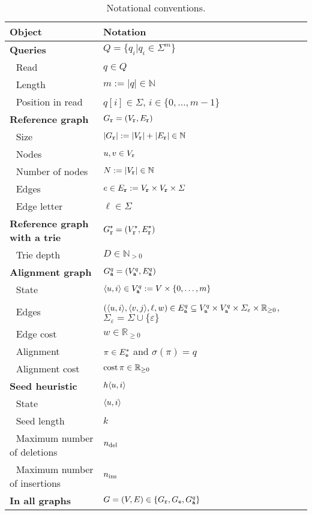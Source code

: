 \begin{table}[!h]
	\centering
	\caption{Notational conventions.}
	\begin{tabular}{ll}
	\hline
	\textbf{Object}	         & \textbf{Notation}\\
	\hline
	\textbf{Queries}  & $Q = \{ q_i \vert q_i \in \Sigma^m \}$ \\
	\,\, Read            & $q \in Q$ \\
	\,\, Length     & $m := \lvert q \rvert\in \mathbb{N}$\\
	\,\, Position in read & $q[i] \in \Sigma$, $i \in \{0,\dots,m-1\}$\\	
	\hline
	\textbf{Reference graph}& $G_\texttt{r}=(V_\texttt{r},E_\texttt{r})$\\
	\,\, Size& $\lvert G_\texttt{r} \rvert := \lvert V_\texttt{r} \rvert + \lvert E_\texttt{r} \rvert \in \mathbb{N}$\\
	\,\, Nodes& $u, v \in V_\texttt{r}$\\
	\,\, Number of nodes& $N := \lvert V_\texttt{r} \rvert \in \mathbb{N}$\\
	\,\, Edges& $e \in E_\texttt{r} := V_\texttt{r} \times V_\texttt{r} \times \Sigma$\\
	\,\, Edge letter& $\ell \in \Sigma$\\
	\textbf{Reference graph with a trie} & $G_\texttt{r}^\texttt{+} = (V_\texttt{r}^\texttt{+}, E_\texttt{r}^\texttt{+})$ \\
	\,\, Trie depth  & $D \in \mathbb{N}_{>0}$\\
	\hline
	\textbf{Alignment graph}& $G_\texttt{a}^{q}=(V_\texttt{a}^{q},E_\texttt{a}^{q})$\\
	\,\, State& $\langle u,i \rangle \in V_\texttt{a}^{q} := V \times \{0,\dots,m\}$\\
	\,\, Edges& $(\langle u,i \rangle, \langle v,j \rangle,\ell,w) \in E_\texttt{a}^{q}
	\subseteq V_\texttt{a}^{q} \times V_\texttt{a}^{q} \times \Sigma_{\varepsilon} \times
	\mathbb{R}_{\geq 0}$, $\Sigma_{\varepsilon} = \Sigma \cup \{\varepsilon\}$\\
	\,\, Edge cost& $w \in \mathbb{R}_{\geq 0}$\\
	\,\, Alignment& $\pi \in E_\texttt{e}^*$ and $\sigma(\pi)=q$ \\
	\,\, Alignment cost& $\operatorname{cost}{\pi} \in \mathbb{R}_{\geq 0}$\\
	\hline
	\textbf{Seed heuristic}& $h\langle u, i \rangle$\\
	\,\, State& $\langle u, i \rangle$\\
	\,\, Seed length& $k$\\
	\,\, Maximum number of deletions& $n_\text{del}$\\
	\,\, Maximum number of insertions& $n_\text{ins}$\\
	\hline
	\textbf{In all graphs}& $G = (V,E) \in \{ G_\texttt{r}, G_\texttt{e}, G_\texttt{a}^{q} \}$ \\

\end{tabular}
\end{table}
